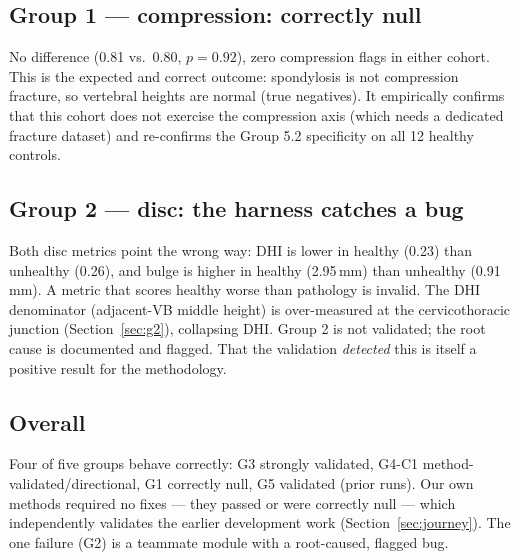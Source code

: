 \subsection{Group 1 --- compression: correctly null}
No difference (0.81 vs.\ 0.80, $p=0.92$), zero compression flags in either cohort. This is the expected
and correct outcome: spondylosis is not compression fracture, so vertebral heights are normal (true
negatives). It empirically confirms that this cohort does not exercise the compression axis (which needs a
dedicated fracture dataset) and re-confirms the Group 5.2 specificity on all 12 healthy controls.

\subsection{Group 2 --- disc: the harness catches a bug}
Both disc metrics point the wrong way: DHI is lower in healthy (0.23) than unhealthy (0.26), and bulge is
higher in healthy (2.95\,mm) than unhealthy (0.91\,mm). A metric that scores healthy worse than pathology
is invalid. The DHI denominator (adjacent-VB middle height) is over-measured at the cervicothoracic
junction (Section~\ref{sec:g2}), collapsing DHI. Group 2 is not validated; the root cause is documented
and flagged. That the validation \emph{detected} this is itself a positive result for the methodology.

\subsection{Overall}
Four of five groups behave correctly: G3 strongly validated, G4-C1 method-validated/directional, G1
correctly null, G5 validated (prior runs). Our own methods required no fixes --- they passed or were
correctly null --- which independently validates the earlier development work (Section~\ref{sec:journey}).
The one failure (G2) is a teammate module with a root-caused, flagged bug.
